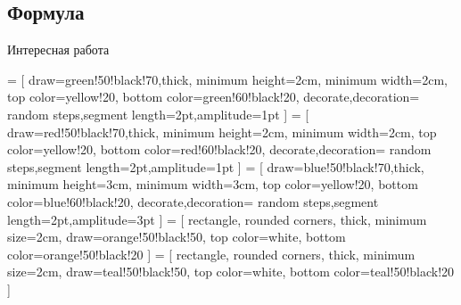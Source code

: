 \subsection{Формула}

\begin{frame}{Интересная работа}
    \begin{center}
         = [
            draw=green!50!black!70,thick,
            minimum height=2cm,
            minimum width=2cm,
            top color=yellow!20,
            bottom color=green!60!black!20,
            decorate,decoration={
                random steps,segment length=2pt,amplitude=1pt
            }
        ]
         = [
            draw=red!50!black!70,thick,
            minimum height=2cm,
            minimum width=2cm,
            top color=yellow!20,
            bottom color=red!60!black!20,
            decorate,decoration={
                random steps,segment length=2pt,amplitude=1pt
            }
        ]
         = [
            draw=blue!50!black!70,thick,
            minimum height=3cm,
            minimum width=3cm,
            top color=yellow!20,
            bottom color=blue!60!black!20,
            decorate,decoration={
                random steps,segment length=2pt,amplitude=3pt
            }
        ]
         = [
            rectangle, rounded corners,
            thick,
            minimum size=2cm,
            draw=orange!50!black!50,
            top color=white,
            bottom color=orange!50!black!20
        ]
         = [
            rectangle, rounded corners,
            thick,
            minimum size=2cm,
            draw=teal!50!black!50,
            top color=white,
            bottom color=teal!50!black!20
        ]
\end{center}
\end{frame}
